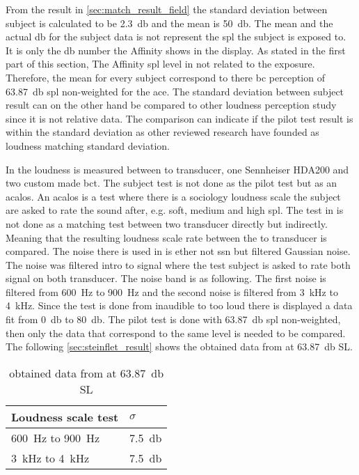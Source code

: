 From the result in \autoref{sec:match_result_field} the standard deviation between subject is calculated to be \SI{2.3}{\decibel} and the mean is \SI{50}{\decibel}. The mean and the actual \si{\decibel} for the subject data is not represent the \gls{spl} the subject is exposed to. It is only the \si{\decibel} number the Affinity shows in the display. As stated in the first part of this section, The Affinity  \gls{spl} level in not related to the exposure. Therefore, the mean for every subject correspond to there \gls{bc} perception of \SI{63.87}{\decibel} \gls{spl} non-weighted for the \gls{ace}. The standard deviation between subject result can on the other hand be compared to other loudness perception study since it is not relative data. The comparison can indicate if the pilot test result is within the standard deviation as other reviewed research have founded as loudness matching standard deviation. 

In \citep{STENFELT201385} the loudness is measured between to transducer, one Sennheiser HDA200 and two custom made \gls{bct}. The subject test is not done as the pilot test but as an \gls{acalos}. An \gls{acalos} is a test where there is a sociology loudness scale the subject are asked to rate the sound after, e.g. soft, medium and high \gls{spl}. The test in \citep{STENFELT201385} is not done as a matching test between two transducer directly but indirectly. Meaning that the resulting loudness scale rate between the to transducer is compared. The noise there is used in \citep{STENFELT201385} is ether not \gls{ssn} but filtered Gaussian noise. The noise was filtered intro to signal where the test subject is asked to rate both signal on both transducer. The noise band is as following. The first noise is filtered from \SI{600}{\hertz} to \SI{900}{\hertz} and the second noise is filtered from \SI{3}{\kilo\hertz} to \SI{4}{\kilo\hertz}. Since the test is done from inaudible to too loud there is displayed a data fit from \SI{0}{\decibel} to \SI{80}{\decibel}. The pilot test is done with \SI{63.87}{\decibel} \gls{spl} non-weighted, then only the data that correspond to the same level is needed to be compared. The following \autoref{sec:steinflet_result} shows the obtained data from \citep{STENFELT201385} at \SI{63.87}{\decibel} SL.


\begin{table}[H]
\centering
\caption{obtained data from \citep{STENFELT201385} at \SI{63.87}{\decibel} SL}
\begin{tabular}{l|l}
Loudness scale test                        & $\sigma$            \\ \hline
\SI{600}{\hertz} to \SI{900}{\hertz}       & \SI{7.5}{\decibel} \\
\SI{3}{\kilo\hertz} to \SI{4}{\kilo\hertz} & \SI{7.5}{\decibel}
\end{tabular}
\label{sec:steinflet_result}
\end{table}

